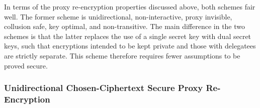 In terms of the proxy re-encryption properties discussed above, both schemes fair well. The former scheme is unidirectional, non-interactive, proxy invisible, collusion safe, key optimal, and non-transitive. The main difference in the two schemes is that the latter replaces the use of a single secret key with dual secret keys, such that encryptions intended to be kept private and those with delegatees are strictly separate. This scheme therefore requires fewer assumptions to be proved secure.

\subsubsection{Unidirectional Chosen-Ciphertext Secure Proxy Re-Encryption}

\cite{lv11:2011:article}
